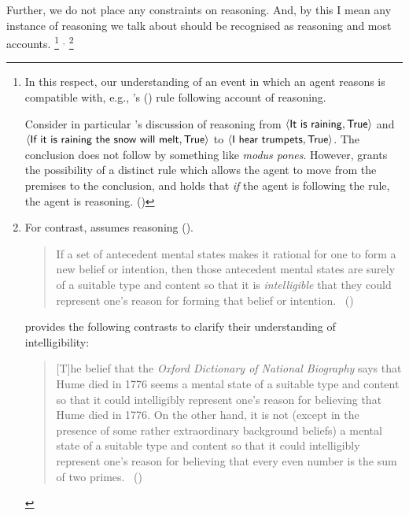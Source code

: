 \begin{note}
  Further, we do not place any constraints on reasoning.
  And, by this I mean any instance of reasoning we talk about should be recognised as reasoning and most accounts.%
  \footnote{
    In this respect, our understanding of an event in which an agent reasons is compatible with, e.g., \citeauthor{Broome:2013aa}'s (\citeyear{Broome:2013aa}) rule following account of reasoning.

    Consider in particular \citeauthor{Broome:2013aa}'s discussion of reasoning from \(\pv{\prop{It is raining}}{\val{True}}\) and \(\pv{\prop{If it is raining the snow will melt}}{\val{True}}\) to \(\pv{\prop{I hear trumpets}}{\val{True}}\).
    The conclusion does not follow by something like \emph{modus pones}.
    However, \citeauthor{Broome:2013aa} grants the possibility of a distinct rule which allows the agent to move from the premises to the conclusion, and holds that \emph{if} the agent is following the rule, the agent is reasoning.
    (\citeyear[233]{Broome:2013aa})
  }%
  \(^{,}\)%
  \footnote{
    For contrast, \citeauthor{Wedgwood:2006ui} assumes reasoning  (\citeyear[600]{Wedgwood:2006ui}).

   \begin{quote}
    If a set of antecedent mental states makes it rational for one to form a new belief or intention, then those antecedent mental states are surely of a suitable type and content so that it is \emph{intelligible} that they could represent one's reason for forming that belief or intention.%
    \mbox{ }\hfill\mbox{(\citeyear[662]{Wedgwood:2006ui})}
  \end{quote}

   \citeauthor{Wedgwood:2006ui} provides the following contrasts to clarify their understanding of intelligibility:

  \begin{quote}
    [T]he belief that the \emph{Oxford Dictionary of National Biography} says that Hume died in 1776 seems a mental state of a suitable type and content so that it could intelligibly represent one's reason for believing that Hume died in 1776.
    On the other hand, it is not (except in the presence of some rather extraordinary background beliefs) a mental state of a suitable type and content so that it could intelligibly represent one's reason for believing that every even number is the sum of two primes.%
    \mbox{ }\hfill\mbox{(\citeyear[662]{Wedgwood:2006ui})}
  \end{quote}

}
\end{note}
